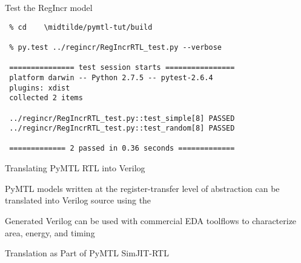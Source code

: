 \begin{task}\begin{frame}[fragile]{Test the RegIncr model}

\vspace{-0.15in}
\begin{Verbatim}[commandchars=\\\{\}]
 % mkdir \midtilde/pymtl-tut/build
 % cd    \midtilde/pymtl-tut/build

 % py.test ../regincr/RegIncrRTL_test.py --verbose

 =============== test session starts ================
 platform darwin -- Python 2.7.5 -- pytest-2.6.4
 plugins: xdist
 collected 2 items

 ../regincr/RegIncrRTL_test.py::test_simple[8] PASSED
 ../regincr/RegIncrRTL_test.py::test_random[8] PASSED

 ============= 2 passed in 0.36 seconds =============
\end{Verbatim}

\end{frame}
\end{task}

\begin{frame}{Translating PyMTL RTL into Verilog}

\begin{cbxlist}

  \1 PyMTL models written at the register-transfer level of abstraction
     can be translated into Verilog source using the 

  \1 Generated Verilog can be used with commercial EDA toolflows to
    characterize area, energy, and timing

\end{cbxlist}

\vspace{0.3in}

\end{frame}

\begin{frame}{Translation as Part of PyMTL SimJIT-RTL}

  \vspace{0.2in}

\end{frame}

